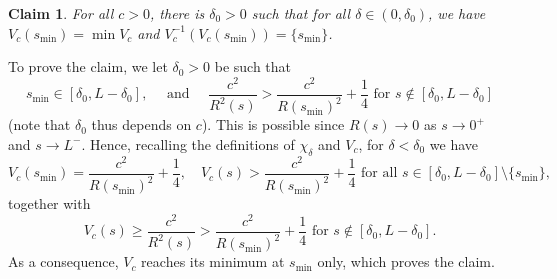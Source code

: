 \documentclass[JEP,XML,SOM,Unicode]{cedram}
\newtheorem*{claim}{Claim}
\theoremstyle{definition}
\newcommand{\ce}{c}
\begin{document}
\begin{claim}
For all $\ce>0$, there is $\delta_0>0$ such that for all $\delta \in (0,\delta_0)$, we have $V_\ce(s_{\min})= \min V_\ce$ and $V_\ce^{-1}(V_\ce(s_{\min})) = \{ s_{\min}\}$.
\end{claim}

To prove the claim, we let $\delta_0>0$ be such that
\[
s_{\min} \in [\delta_0, L-\delta_0], \quad \text{ and }
\quad \frac{\ce^2}{R^2(s)} > \frac{\ce^2}{R(s_{\min})^2} +\frac14 \text{ for } s \notin [\delta_0, L-\delta_0]
\]
(note that $\delta_0$ thus depends on $\ce$).
This is possible since $R(s)\to 0$ as $s\to 0^+$ and $s\to L^-$.
Hence, recalling the definitions of $\chi_\delta$ and $V_\ce$, for $\delta < \delta_0$ we have
\[
V_\ce(s_{\min})= \frac{\ce^2}{R(s_{\min})^2} + \frac14, \quad V_\ce(s) > \frac{\ce^2}{R(s_{\min})^2} + \frac14 \text{ for all }s \in [\delta_0, L-\delta_0] \setminus \{s_{\min}\},
\]
together with
\[
V_\ce(s) \geq \frac{\ce^2}{R^2(s)} > \frac{\ce^2}{R(s_{\min})^2} + \frac14 \text{ for }s \notin [\delta_0, L-\delta_0].
\]
As a consequence, $V_\ce$ reaches its minimum at $s_{\min}$ only, which proves the claim.
\end{document}
